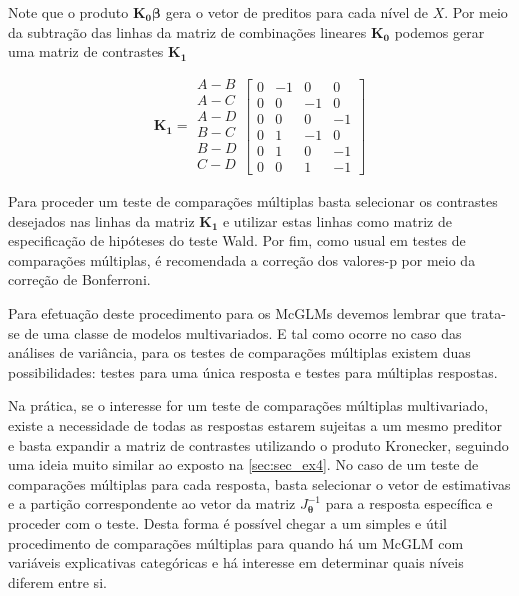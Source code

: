 \documentclass[AMA,STIX1COL]{WileyNJD-v2}
\begin{document}
Note que o produto $\boldsymbol{K_0} \boldsymbol{\beta}$ gera o vetor de preditos para cada nível de $X$. Por meio da subtração das linhas da matriz de combinações lineares $\boldsymbol{K_0}$ podemos gerar uma matriz de contrastes $\boldsymbol{K_1}$

$$
    \boldsymbol{K_1} = 
      \begin{matrix}
        A-B\\ 
        A-C\\ 
        A-D\\ 
        B-C\\
        B-D\\
        C-D\\ 
      \end{matrix} 
    \begin{bmatrix}
      0 & -1 &  0 &  0\\ 
      0 &  0 & -1 &  0\\ 
      0 &  0 &  0 & -1\\ 
      0 &  1 & -1 &  0\\ 
      0 &  1 &  0 & -1\\ 
      0 &  0 &  1 & -1 
    \end{bmatrix}
$$

Para proceder um teste de comparações múltiplas basta selecionar os contrastes desejados nas linhas da matriz $\boldsymbol{K_1}$ e utilizar estas linhas como matriz de especificação de hipóteses do teste Wald. Por fim, como usual em testes de comparações múltiplas, é recomendada a correção dos valores-p por meio da correção de Bonferroni.

Para efetuação deste procedimento para os McGLMs devemos lembrar que trata-se de uma classe de modelos multivariados. E tal como ocorre no caso das análises de variância, para os testes de comparações múltiplas existem duas possibilidades: testes para uma única resposta e testes para múltiplas respostas. 

Na prática, se o interesse for um teste de comparações múltiplas multivariado, existe a necessidade de todas as respostas estarem sujeitas a um mesmo preditor e basta expandir a matriz de contrastes utilizando o produto Kronecker, seguindo uma ideia muito similar ao exposto na \autoref{sec:sec_ex4}. No caso de um teste de comparações múltiplas para cada resposta, basta selecionar o vetor de estimativas e a partição correspondente ao vetor da matriz $J_{\boldsymbol{\theta}}^{-1}$ para a resposta específica e proceder com o teste. Desta forma é possível chegar a um simples e útil procedimento de comparações múltiplas para quando há um McGLM com variáveis explicativas categóricas e há interesse em determinar quais níveis diferem entre si.
\end{document}
